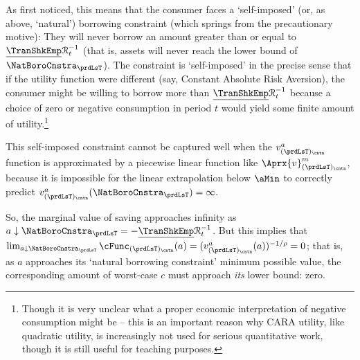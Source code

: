 \documentclass[titlepage, headings=optiontotocandhead]{Resources/texmf-local/tex/latex/econtex}
\begin{document}
As \cite{zeldesStochastic} first noticed, this means that the consumer faces a `self-imposed' (or, as above, `natural') borrowing constraint (which springs from the precautionary motive): They will never borrow an amount greater than or equal to $\underline{\TranShkEmp}\mathcal{R}_{t}^{-1}$ (that is, assets will never reach the lower bound of $\NatBoroCnstra_{\prdLsT}$).  The constraint is `self-imposed' in the precise sense that if the utility function were different (say, Constant Absolute Risk Aversion), the consumer might be willing to borrow more than $\underline{\TranShkEmp}\mathcal{R}_{t}^{-1}$ because a choice of zero or negative consumption in period $t$ would yield some finite amount of utility.\footnote{Though it is very unclear what a proper economic interpretation of negative consumption might be -- this is an important reason why CARA utility, like quadratic utility, is increasingly not used for serious quantitative work, though it is still useful for teaching purposes.}

This self-imposed constraint cannot be captured well when the $v^{a}_{(\prdLsT)_\cntn}$ function is approximated by a piecewise linear function like $\Aprx{v}^{m}_{(\prdLsT)_\cntn}$, because it is impossible for the linear extrapolation below $\aMin$ to correctly predict $v^{a}_{(\prdLsT)_\cntn}(\NatBoroCnstra_{\prdLsT})=\infty.$ %


So, the marginal value of saving approaches infinity as $a \downarrow \NatBoroCnstra_{\prdLsT}=-\underline{\TranShkEmp}\mathcal{R}_{t}^{-1}$.  But this implies that $\lim_{a \downarrow \NatBoroCnstra_{\prdLsT}} \cFunc_{(\prdLsT)_\cntn}(a) = (v^{a}_{(\prdLsT)_\cntn}(a))^{-1/\rho} = 0$; that is, as $a$ approaches its `natural borrowing constraint' minimum possible value, the corresponding amount of worst-case $c$ must approach \textit{its} lower bound: zero.
\end{document}
